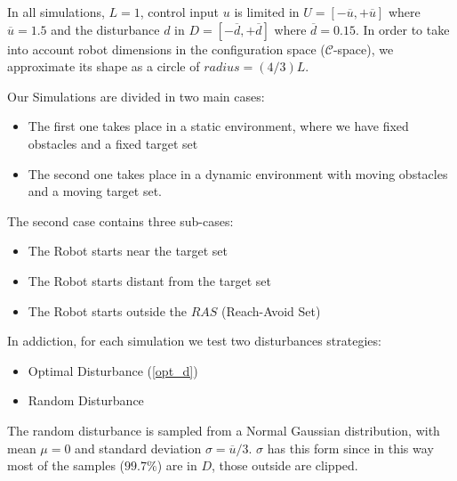 In all simulations, $L=1$, control input $u$ is limited in $U = [-\overline{u}, +\overline{u}]$ where $\overline{u}=1.5$ and the disturbance $d$ in $D=[-\overline{d}, +\overline{d}]$ where $\overline{d}=0.15$. In order to take into account robot dimensions in the configuration space ($\mathcal{C}$-space), we approximate its shape as a circle of $radius = (4/3)L$.

Our Simulations are divided in two main cases: 
\begin{itemize}
    \item The first one takes place in a static environment, where we have fixed obstacles and a fixed target set 
    \item The second one takes place in a dynamic environment with moving obstacles and a moving target set.
\end{itemize}
The second case contains three sub-cases:  
\begin{itemize}
    \item The Robot starts near the target set
    \item The Robot starts distant from the target set
    \item The Robot starts outside the $RAS$ (Reach-Avoid Set)
\end{itemize}
In addiction, for each simulation we test two disturbances strategies: 
\begin{itemize}
    \item Optimal Disturbance (\ref{opt_d})
    \item Random Disturbance 
\end{itemize}
The random disturbance is sampled from a Normal Gaussian distribution, with mean $\mu=0$ and standard deviation $\sigma=\overline{u}/3$. $\sigma$ has this form since in this way most of the samples ($99.7\%$) are in $D$, those outside are clipped.

